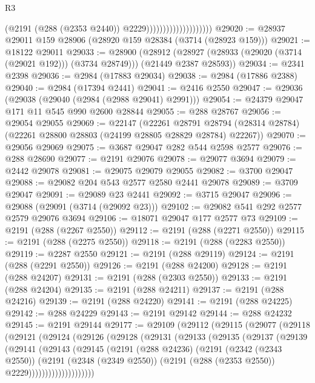 \begin{lexlean}{R3}
\begin{coremodule}
                                          (@2191 (@288 (@2353 @2440)) @2229))))))))))))))))))))
@29020 := @28937 @29011 @159 @28906 (@28920 @159 @28384 (@3714 (@28923 @159)))
@29021 := @18122 @29011
@29033 := @28900
    (@28912 (@28927 (@28933 (@29020 (@3714 (@29021 @192))) (@3734 @28749))) (@21449 @2387 @28593))
@29034 := @2341 @2398
@29036 := @2984 (@17883 @29034)
@29038 := @2984 (@17886 @2388)
@29040 := @2984 (@17394 @2441)
@29041 := @2416 @2550
@29047 := @29036 (@29038 (@29040 (@2984 (@2988 @29041) @2991)))
@29054 := @24379 @29047 @171 @11 @545 @990 @2600 @28844
@29055 := @288 @28767
@29056 := @29054 @29055
@29069 := @22147
    (@22261
      @28791
      @28794
      (@28314 @28784)
      (@22261 @28800 @28803 (@24199 @28805 @28829 @28784) @22267))
@29070 := @29056 @29069
@29075 := @3687 @29047 @282 @544 @2598 @2577
@29076 := @288 @28690
@29077 := @2191 @29076
@29078 := @29077 @3694
@29079 := @2442 @29078
@29081 := @29075 @29079 @29055
@29082 := @3700 @29047
@29088 := @29082 @204 @543 @2577 @2580 @2441 @29078
@29089 := @3709 @29047
@29091 := @29089 @23 @2441
@29092 := @3715 @29047
@29096 := @29088 (@29091 (@3714 (@29092 @23)))
@29102 := @29082 @541 @292 @2577 @2579 @29076 @3694
@29106 := @18071 @29047 @177 @2577 @73
@29109 := @2191 (@288 (@2267 @2550))
@29112 := @2191 (@288 (@2271 @2550))
@29115 := @2191 (@288 (@2275 @2550))
@29118 := @2191 (@288 (@2283 @2550))
@29119 := @2287 @2550
@29121 := @2191 (@288 @29119)
@29124 := @2191 (@288 (@2291 @2550))
@29126 := @2191 (@288 @24200)
@29128 := @2191 (@288 @24207)
@29131 := @2191 (@288 (@2303 @2550))
@29133 := @2191 (@288 @24204)
@29135 := @2191 (@288 @24211)
@29137 := @2191 (@288 @24216)
@29139 := @2191 (@288 @24220)
@29141 := @2191 (@288 @24225)
@29142 := @288 @24229
@29143 := @2191 @29142
@29144 := @288 @24232
@29145 := @2191 @29144
@29177 := @29109
    (@29112
      (@29115
        (@29077
          (@29118
            (@29121
              (@29124
                (@29126
                  (@29128
                    (@29131
                      (@29133
                        (@29135
                          (@29137
                            (@29139
                              (@29141
                                (@29143
                                  (@29145
                                    (@2191
                                      (@288 @24236)
                                      (@2191
                                        (@2342 (@2343 @2550))
                                        (@2191
                                          (@2348 (@2349 @2550))
                                          (@2191 (@288 (@2353 @2550)) @2229))))))))))))))))))))

\end{coremodule}
\end{lexlean}

